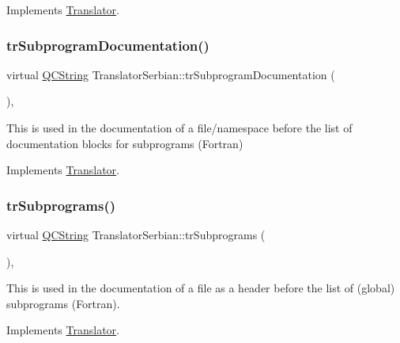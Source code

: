 Implements \mbox{\hyperlink{class_translator}{Translator}}.

\mbox{\label{class_translator_serbian_a229b2d32d9066d4fe81191f6eacb4815}} 
\subsubsection{\texorpdfstring{trSubprogramDocumentation()}{trSubprogramDocumentation()}}
{\footnotesize\ttfamily virtual \mbox{\hyperlink{class_q_c_string}{Q\+C\+String}} Translator\+Serbian\+::tr\+Subprogram\+Documentation (\begin{DoxyParamCaption}{ }\end{DoxyParamCaption})\hspace{0.3cm}{\ttfamily [inline]}, {\ttfamily [virtual]}}

This is used in the documentation of a file/namespace before the list of documentation blocks for subprograms (Fortran) 

Implements \mbox{\hyperlink{class_translator}{Translator}}.

\mbox{\label{class_translator_serbian_a08176b47563ca30cea592946741ba0fa}} 
\subsubsection{\texorpdfstring{trSubprograms()}{trSubprograms()}}
{\footnotesize\ttfamily virtual \mbox{\hyperlink{class_q_c_string}{Q\+C\+String}} Translator\+Serbian\+::tr\+Subprograms (\begin{DoxyParamCaption}{ }\end{DoxyParamCaption})\hspace{0.3cm}{\ttfamily [inline]}, {\ttfamily [virtual]}}

This is used in the documentation of a file as a header before the list of (global) subprograms (Fortran). 

Implements \mbox{\hyperlink{class_translator}{Translator}}.

\mbox{\label{class_translator_serbian_a1a9c0884d5e88102675e95abba0405d0}} 

